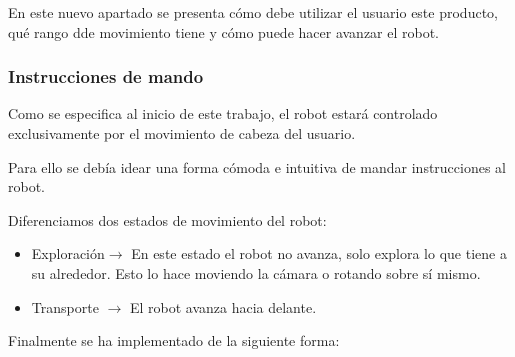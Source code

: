 \documentclass[twoside, 12pt]{epstfg}
\begin{document}
En este nuevo apartado se presenta cómo debe utilizar el usuario este producto, qué rango dde movimiento tiene y cómo puede hacer avanzar el robot.

\subsubsection{Instrucciones de mando}

Como se especifica al inicio de este trabajo, el robot estará controlado exclusivamente por el movimiento de cabeza del usuario.

Para ello se debía idear una forma cómoda e intuitiva de mandar instrucciones al robot.

Diferenciamos dos estados de movimiento del robot:
\begin{itemize}
	\item Exploración$\rightarrow$ En este estado el robot no avanza, solo explora lo que tiene a su alrededor. Esto lo hace moviendo la cámara o rotando sobre sí mismo.
	\item Transporte $\rightarrow$ El robot avanza hacia delante.
\end{itemize}

Finalmente se ha implementado de la siguiente forma:
\end{document}

